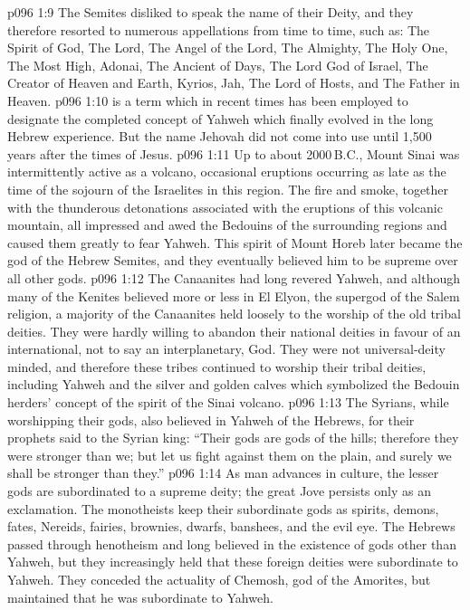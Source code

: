 \vs p096 1:9 \bibnobreakspace {} The Semites disliked to speak the name of their Deity, and they therefore resorted to numerous appellations from time to time, such as: The Spirit of God, The Lord, The Angel of the Lord, The Almighty, The Holy One, The Most High, Adonai, The Ancient of Days, The Lord God of Israel, The Creator of Heaven and Earth, Kyrios, Jah, The Lord of Hosts, and The Father in Heaven.
\vs p096 1:10 \pc {} is a term which in recent times has been employed to designate the completed concept of Yahweh which finally evolved in the long Hebrew experience. But the name Jehovah did not come into use until 1,500 years after the times of Jesus.
\vs p096 1:11 \pc Up to about 2000\,B.C., Mount Sinai was intermittently active as a volcano, occasional eruptions occurring as late as the time of the sojourn of the Israelites in this region. The fire and smoke, together with the thunderous detonations associated with the eruptions of this volcanic mountain, all impressed and awed the Bedouins of the surrounding regions and caused them greatly to fear Yahweh. This spirit of Mount Horeb later became the god of the Hebrew Semites, and they eventually believed him to be supreme over all other gods.
\vs p096 1:12 The Canaanites had long revered Yahweh, and although many of the Kenites believed more or less in El Elyon, the supergod of the Salem religion, a majority of the Canaanites held loosely to the worship of the old tribal deities. They were hardly willing to abandon their national deities in favour of an international, not to say an interplanetary, God. They were not universal\hyp{}deity minded, and therefore these tribes continued to worship their tribal deities, including Yahweh and the silver and golden calves which symbolized the Bedouin herders’ concept of the spirit of the Sinai volcano.
\vs p096 1:13 The Syrians, while worshipping their gods, also believed in Yahweh of the Hebrews, for their prophets said to the Syrian king: “Their gods are gods of the hills; therefore they were stronger than we; but let us fight against them on the plain, and surely we shall be stronger than they.”
\vs p096 1:14 As man advances in culture, the lesser gods are subordinated to a supreme deity; the great Jove persists only as an exclamation. The monotheists keep their subordinate gods as spirits, demons, fates, Nereids, fairies, brownies, dwarfs, banshees, and the evil eye. The Hebrews passed through henotheism and long believed in the existence of gods other than Yahweh, but they increasingly held that these foreign deities were subordinate to Yahweh. They conceded the actuality of Chemosh, god of the Amorites, but maintained that he was subordinate to Yahweh.
